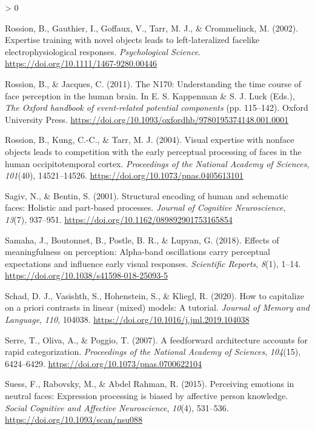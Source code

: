 \documentclass[
  english,
  man,floatsintext]{apa7}
\newlength{\cslhangindent}
\newenvironment{CSLReferences}[2] %
 {%
  \setlength{\parindent}{0pt}
  \ifodd #1 \everypar{\setlength{\hangindent}{\cslhangindent}}\ignorespaces\fi
  \ifnum #2 > 0
  \setlength{\parskip}{#2\baselineskip}
  \fi
 }%
 {}
\begin{document}
\begin{CSLReferences}{1}{0}
\leavevmode\hypertarget{ref-rossion2002}{}%
Rossion, B., Gauthier, I., Goffaux, V., Tarr, M. J., \& Crommelinck, M. (2002). Expertise training with novel objects leads to left-lateralized facelike electrophysiological responses. \emph{Psychological Science}. \url{https://doi.org/10.1111/1467-9280.00446}

\leavevmode\hypertarget{ref-rossion2011}{}%
Rossion, B., \& Jacques, C. (2011). The {N170}: Understanding the time course of face perception in the human brain. In E. S. Kappenman \& S. J. Luck (Eds.), \emph{The {Oxford} handbook of event-related potential components} (pp. 115--142). Oxford University Press. \url{https://doi.org/10.1093/oxfordhb/9780195374148.001.0001}

\leavevmode\hypertarget{ref-rossion2004}{}%
Rossion, B., Kung, C.-C., \& Tarr, M. J. (2004). Visual expertise with nonface objects leads to competition with the early perceptual processing of faces in the human occipitotemporal cortex. \emph{Proceedings of the National Academy of Sciences}, \emph{101}(40), 14521--14526. \url{https://doi.org/10.1073/pnas.0405613101}

\leavevmode\hypertarget{ref-sagiv2001}{}%
Sagiv, N., \& Bentin, S. (2001). Structural encoding of human and schematic faces: Holistic and part-based processes. \emph{Journal of Cognitive Neuroscience}, \emph{13}(7), 937--951. \url{https://doi.org/10.1162/089892901753165854}

\leavevmode\hypertarget{ref-samaha2018}{}%
Samaha, J., Boutonnet, B., Postle, B. R., \& Lupyan, G. (2018). Effects of meaningfulness on perception: Alpha-band oscillations carry perceptual expectations and influence early visual responses. \emph{Scientific Reports}, \emph{8}(1), 1--14. \url{https://doi.org/10.1038/s41598-018-25093-5}

\leavevmode\hypertarget{ref-schad2020}{}%
Schad, D. J., Vasishth, S., Hohenstein, S., \& Kliegl, R. (2020). How to capitalize on a priori contrasts in linear (mixed) models: A tutorial. \emph{Journal of Memory and Language}, \emph{110}, 104038. \url{https://doi.org/10.1016/j.jml.2019.104038}

\leavevmode\hypertarget{ref-serre2007}{}%
Serre, T., Oliva, A., \& Poggio, T. (2007). A feedforward architecture accounts for rapid categorization. \emph{Proceedings of the National Academy of Sciences}, \emph{104}(15), 6424--6429. \url{https://doi.org/10.1073/pnas.0700622104}

\leavevmode\hypertarget{ref-suess2015}{}%
Suess, F., Rabovsky, M., \& Abdel Rahman, R. (2015). Perceiving emotions in neutral faces: Expression processing is biased by affective person knowledge. \emph{Social Cognitive and Affective Neuroscience}, \emph{10}(4), 531--536. \url{https://doi.org/10.1093/scan/nsu088}


\end{CSLReferences}
\end{document}

